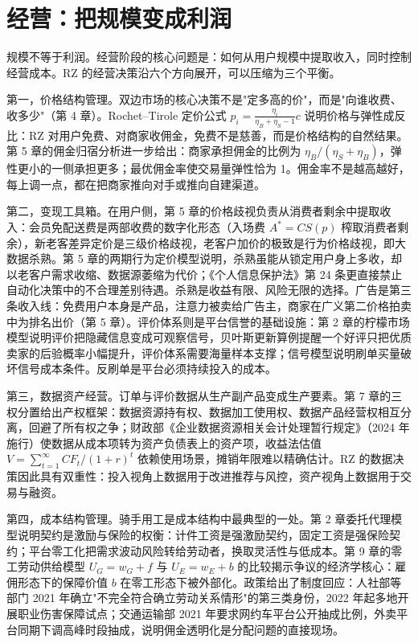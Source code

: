 \section{经营：把规模变成利润}

规模不等于利润。经营阶段的核心问题是：如何从用户规模中提取收入，同时控制经营成本。RZ 的经营决策沿六个方向展开，可以压缩为三个平衡。

第一，价格结构管理。双边市场的核心决策不是"定多高的价"，而是"向谁收费、收多少"（第 4 章）。Rochet--Tirole 定价公式 $p_i=\frac{\eta_i}{\eta_B+\eta_S-1}c$ 说明价格与弹性成反比：RZ 对用户免费、对商家收佣金，免费不是慈善，而是价格结构的自然结果。第 5 章的佣金归宿分析进一步给出：商家承担佣金的比例为 $\eta_B/(\eta_S+\eta_B)$，弹性更小的一侧承担更多；最优佣金率使交易量弹性恰为 1。佣金率不是越高越好，每上调一点，都在把商家推向对手或推向自建渠道。

第二，变现工具箱。在用户侧，第 5 章的价格歧视负责从消费者剩余中提取收入：会员免配送费是两部收费的数字化形态（入场费 $A^{*}=CS(p)$ 榨取消费者剩余），新老客差异定价是三级价格歧视，老客户加价的极致是行为价格歧视，即大数据杀熟。第 5 章的两期行为定价模型说明，杀熟虽能从锁定用户身上多收，却以老客户需求收缩、数据源萎缩为代价；《个人信息保护法》第 24 条更直接禁止自动化决策中的不合理差别待遇。杀熟是收益有限、风险无限的选择。广告是第三条收入线：免费用户本身是产品，注意力被卖给广告主，商家在广义第二价格拍卖中为排名出价（第 5 章）。评价体系则是平台信誉的基础设施：第 2 章的柠檬市场模型说明评价把隐藏信息变成可观察信号，贝叶斯更新算例提醒一个好评只把优质卖家的后验概率小幅提升，评价体系需要海量样本支撑；信号模型说明刷单买量破坏信号成本条件。反刷单是平台必须持续投入的成本。

第三，数据资产经营。订单与评价数据从生产副产品变成生产要素。第 7 章的三权分置给出产权框架：数据资源持有权、数据加工使用权、数据产品经营权相互分离，回避了所有权之争；财政部《企业数据资源相关会计处理暂行规定》（2024 年施行）使数据从成本项转为资产负债表上的资产项，收益法估值 $V=\sum_{t=1}^{\infty}CF_t/(1+r)^t$ 依赖使用场景，摊销年限难以精确估计。RZ 的数据决策因此具有双重性：投入视角上数据用于改进推荐与风控，资产视角上数据用于交易与融资。

第四，成本结构管理。骑手用工是成本结构中最典型的一处。第 2 章委托代理模型说明契约是激励与保险的权衡：计件工资是强激励契约，固定工资是强保险契约；平台零工化把需求波动风险转给劳动者，换取灵活性与低成本。第 9 章的零工劳动供给模型 $U_G=w_G+f$ 与 $U_E=w_E+b$ 的比较揭示争议的经济学核心：雇佣形态下的保障价值 $b$ 在零工形态下被外部化。政策给出了制度回应：人社部等部门 2021 年确立"不完全符合确立劳动关系情形"的第三类身份，2022 年起多地开展职业伤害保障试点；交通运输部 2021 年要求网约车平台公开抽成比例，外卖平台同期下调高峰时段抽成，说明佣金透明化是分配问题的直接现场。

